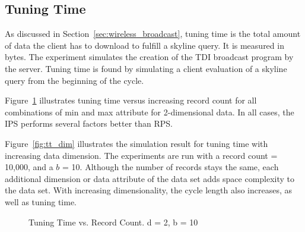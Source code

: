 \subsection{Tuning Time}\label{sec:exp_tuning_time}

As discussed in Section~\ref{sec:wireless_broadcast}, tuning time is the total amount of data the client has to download to fulfill a skyline query. It is measured in bytes. The experiment simulates the creation of the TDI broadcast program by the server. Tuning time is found by simulating a client evaluation of a skyline query from the beginning of the cycle.

Figure~\ref{fig:tt_rec} illustrates tuning time versus increasing record count for all combinations of min and max attribute for 2-dimensional data. In all cases, the IPS performs several factors better than RPS.

Figure~\ref{fig:tt_dim} illustrates the simulation result for tuning time with increasing data dimension. The experiments are run with a record count = 10,000, and a $b$ = 10. Although the number of records stays the same, each additional dimension or data attribute of the data set adds space complexity to the data set. With increasing dimensionality, the cycle length also increases, as well as tuning time.

\begin{figure}[t]
  \centering
  \caption{\small Tuning Time vs. Record Count. d = 2, b = 10}
  \label{fig:tt_rec}
\end{figure}

